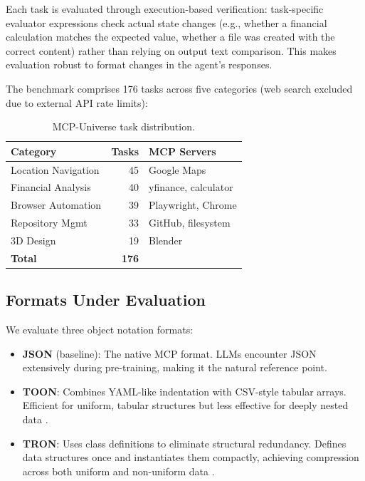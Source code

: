 \documentclass[10pt,twocolumn,letterpaper]{article}
\begin{document}
Each task is evaluated through execution-based verification: task-specific evaluator expressions check actual state changes (e.g., whether a financial calculation matches the expected value, whether a file was created with the correct content) rather than relying on output text comparison. This makes evaluation robust to format changes in the agent's responses.

The benchmark comprises 176 tasks across five categories (web search excluded due to external API rate limits):

\begin{table}[h]
    \centering
    \footnotesize
    \caption{MCP-Universe task distribution.}
    \label{tab:universe_tasks}
    \begin{tabular}{@{}lrl@{}}
        \toprule
        \textbf{Category} & \textbf{Tasks} & \textbf{MCP Servers} \\
        \midrule
        Location Navigation  & 45 & Google Maps \\
        Financial Analysis   & 40 & yfinance, calculator \\
        Browser Automation   & 39 & Playwright, Chrome \\
        Repository Mgmt      & 33 & GitHub, filesystem \\
        3D Design            & 19 & Blender \\
        \midrule
        \textbf{Total}       & \textbf{176} & \\
        \bottomrule
    \end{tabular}
\end{table}

\subsection{Formats Under Evaluation}
\label{sec:formats}

We evaluate three object notation formats:

\begin{itemize}
    \item \textbf{JSON} (baseline): The native MCP format. LLMs encounter JSON extensively during pre-training, making it the natural reference point.
    \item \textbf{TOON}: Combines YAML-like indentation with CSV-style tabular arrays. Efficient for uniform, tabular structures but less effective for deeply nested data \citep{toon-format/toon_2026}.
    \item \textbf{TRON}: Uses class definitions to eliminate structural redundancy. Defines data structures once and instantiates them compactly, achieving compression across both uniform and non-uniform data \citep{tron-format/tron-javascript_2026}.
\end{itemize}
\end{document}
